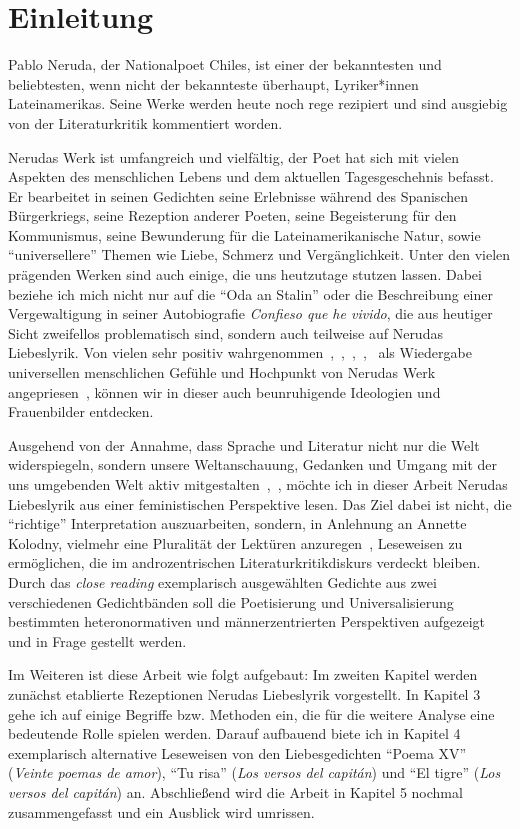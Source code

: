 \section{Einleitung}

Pablo Neruda, der Nationalpoet Chiles, ist einer der bekanntesten und beliebtesten, wenn nicht der bekannteste überhaupt, Lyriker*innen Lateinamerikas.
Seine Werke werden heute noch rege rezipiert und sind ausgiebig von der Literaturkritik kommentiert worden.


Nerudas Werk ist umfangreich und vielfältig, der Poet hat sich mit vielen Aspekten des menschlichen Lebens und dem aktuellen Tagesgeschehnis befasst.
Er bearbeitet in seinen Gedichten seine Erlebnisse während des Spanischen Bürgerkriegs, seine Rezeption anderer Poeten, seine Begeisterung für den Kommunismus, seine Bewunderung für die Lateinamerikanische Natur, sowie ``universellere'' Themen wie Liebe, Schmerz und Vergänglichkeit.
Unter den vielen prägenden Werken sind auch einige, die uns heutzutage stutzen lassen.
Dabei beziehe ich mich nicht nur auf die ``Oda an Stalin'' oder die Beschreibung einer Vergewaltigung in seiner Autobiografie \textit{Confieso que he vivido}, die aus heutiger Sicht zweifellos problematisch sind, sondern auch teilweise auf Nerudas Liebeslyrik.
Von vielen sehr positiv wahrgenommen~\cite{Eandi},~\cite{Ellis1985},~\cite{Araya1982},~\cite{Montes1985},~\cite{Lagos1975} als Wiedergabe universellen menschlichen Gefühle und Hochpunkt von Nerudas Werk angepriesen~\cite{Eandi},
können wir in dieser auch beunruhigende Ideologien und Frauenbilder entdecken.


Ausgehend von der Annahme, dass Sprache und Literatur nicht nur die Welt widerspiegeln, sondern unsere Weltanschauung, Gedanken und Umgang mit der uns umgebenden Welt aktiv mitgestalten~\cite{Kolodny1980},~\cite{North2013},
möchte ich in dieser Arbeit Nerudas Liebeslyrik aus einer feministischen Perspektive lesen.
Das Ziel dabei ist nicht, die ``richtige'' Interpretation auszuarbeiten, sondern, in Anlehnung an Annette Kolodny, vielmehr eine Pluralität der Lektüren anzuregen~\cite{Kolodny1980}, Leseweisen zu ermöglichen, die im androzentrischen Literaturkritikdiskurs verdeckt bleiben.
Durch das \textit{close reading} exemplarisch ausgewählten Gedichte aus zwei verschiedenen Gedichtbänden soll die Poetisierung und Universalisierung bestimmten heteronormativen und männerzentrierten Perspektiven aufgezeigt und in Frage gestellt werden.

Im Weiteren ist diese Arbeit wie folgt aufgebaut:
Im zweiten Kapitel werden zunächst etablierte Rezeptionen Nerudas Liebeslyrik vorgestellt.
In Kapitel 3 gehe ich auf einige Begriffe bzw. Methoden ein, die für die weitere Analyse eine bedeutende Rolle spielen werden.
Darauf aufbauend biete ich in Kapitel 4 exemplarisch alternative Leseweisen von den Liebesgedichten ``Poema XV'' (\textit{Veinte poemas de amor}), ``Tu risa'' (\textit{Los versos del capitán}) und ``El tigre'' (\textit{Los versos del capitán}) an.
Abschließend wird die Arbeit in Kapitel 5 nochmal zusammengefasst und ein Ausblick wird umrissen.

